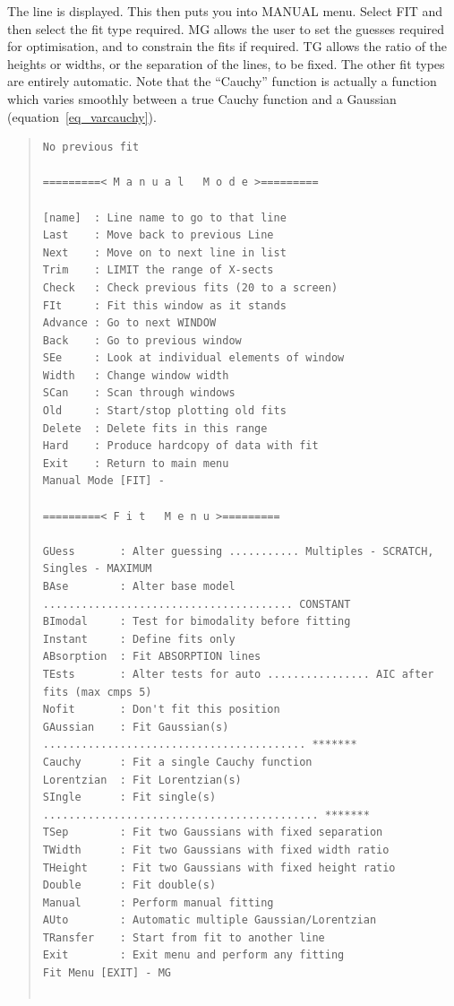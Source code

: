 \documentclass[11pt,twoside]{article}
\begin{document}
The line is displayed.  This then puts you into MANUAL menu. Select FIT
and then select the fit type required.  MG allows the user to set the
guesses required for optimisation, and to constrain the fits if
required. TG allows the ratio of the heights or widths, or the
separation of the lines, to be fixed. The other fit types are entirely
automatic. Note that the ``Cauchy'' function is actually a function
which varies smoothly between a true Cauchy function and a Gaussian
(equation~\ref{eq_varcauchy}).

\begin{quote}\begin{small}\begin{verbatim}
No previous fit

=========< M a n u a l   M o d e >=========

[name]  : Line name to go to that line
Last    : Move back to previous Line
Next    : Move on to next line in list
Trim    : LIMIT the range of X-sects
Check   : Check previous fits (20 to a screen)
FIt     : Fit this window as it stands
Advance : Go to next WINDOW
Back    : Go to previous window
SEe     : Look at individual elements of window
Width   : Change window width
SCan    : Scan through windows
Old     : Start/stop plotting old fits
Delete  : Delete fits in this range
Hard    : Produce hardcopy of data with fit
Exit    : Return to main menu
Manual Mode [FIT] -

=========< F i t   M e n u >=========

GUess       : Alter guessing ........... Multiples - SCRATCH, Singles - MAXIMUM
BAse        : Alter base model ....................................... CONSTANT
BImodal     : Test for bimodality before fitting
Instant     : Define fits only
ABsorption  : Fit ABSORPTION lines
TEsts       : Alter tests for auto ................ AIC after fits (max cmps 5)
Nofit       : Don't fit this position
GAussian    : Fit Gaussian(s) ......................................... *******
Cauchy      : Fit a single Cauchy function
Lorentzian  : Fit Lorentzian(s)
SIngle      : Fit single(s) ........................................... *******
TSep        : Fit two Gaussians with fixed separation
TWidth      : Fit two Gaussians with fixed width ratio
THeight     : Fit two Gaussians with fixed height ratio
Double      : Fit double(s)
Manual      : Perform manual fitting
AUto        : Automatic multiple Gaussian/Lorentzian
TRansfer    : Start from fit to another line
Exit        : Exit menu and perform any fitting
Fit Menu [EXIT] - MG


\end{verbatim}
\end{small}
\end{quote}
\end{document}

